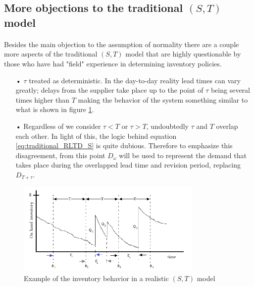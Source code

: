 \documentclass[letterpaper]{article}
\begin{document}
\FloatBarrier

\subsection*{More objections to the traditional $(S,T)$ model}
\paragraph{}
Besides the main objection to the assumption of normality there are a couple more aspects of the traditional $(S,T)$ model that are highly questionable by those who have had "field" experience in determining inventory policies.

\begin{itemize}
	\item[•]$\tau$ treated as deterministic. In the day-to-day reality lead times can vary greatly; delays from the supplier take place up to the point of $\tau$ being several times higher than $T$ making the behavior of the system something similar to what is shown in figure \ref{fig:real_st_behavior}.
	\item[•]Regardless of we consider $\tau<T$ or  $\tau>T$, undoubtedly $\tau$ and $T$ overlap each other. In light of this, the logic behind equation \ref{eq:traditional_RLTD_S} is quite dubious. Therefore to emphasize this disagreement, from this point $D_\omega$ will be used to represent the demand that takes place during the overlapped lead time and revision period, replacing ${D}_{T+\tau}$.
\end{itemize}

\begin{figure}[!hbt]
    \centering
    \includegraphics[width=0.8\textwidth]{./figs/ST_reality_eng_600x300px.png}
    \caption{Example of the inventory behavior \linebreak in a realistic $(S,T)$ model}
    \label{fig:real_st_behavior}
\end{figure}

\FloatBarrier
\end{document}

